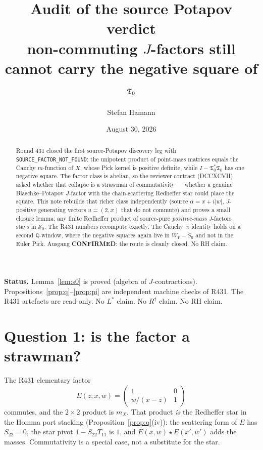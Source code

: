 \documentclass[11pt]{article}
\title{\bfseries Audit of the source Potapov verdict\\[2mm]
\large non-commuting $J$-factors still cannot carry the
negative square of $\Tfrak_0$}
\author{Stefan Hamann}
\date{August 30, 2026}
\theoremstyle{remark}
\newcommand{\Tfrak}{\mathfrak{T}}
\newcommand{\redh}{\mathbin{\star}}
\newcommand{\Sk}{\mathcal{S}}
\begin{document}
\maketitle

\begin{abstract}\noindent
Round 431 closed the first source-Potapov discovery
leg with \texttt{SOURCE\_FACTOR\_NOT\_FOUND}: the
unipotent product of point-mass matrices equals the
Cauchy $m$-function of $X$, whose Pick kernel is
positive definite, while $I-\Tfrak_0^*\Tfrak_0$ has one
negative square.
The factor class is abelian, so the reviewer contract
(DCCXCVII) asked whether that collapse is a strawman of
commutativity --- whether a genuine Blaschke--Potapov
$J$-factor with the chain-scattering Redheffer star could
place the square.
This note rebuilds that richer class independently
(source $\alpha=x+i\lvert w\rvert$, $J$-positive generating
vectors $u=(2,x)$ that do not commute) and proves a small
closure lemma: any finite Redheffer product of
source-pure \emph{positive-mass} $J$-factors stays in
$\Sk_0$.
The R431 numbers recompute exactly.
The Cauchy--$\pi$ identity holds on a second $\mathbb{Q}$-window,
where the negative squares again live in $W_Y-S_0$ and not
in the Euler Pick.
Ausgang \textbf{CONFIRMED}: the route is cleanly closed.
No RH claim.
\end{abstract}

\medskip\noindent
\textbf{Status.}\enspace
Lemma~\ref{lem:s0} is proved (algebra of $J$-contractions).
Propositions~\ref{prop:q}--\ref{prop:pi} are independent
machine checks of R431.
The R431 artefacts are read-only.
No $L^{*}$ claim.  No $R^\dagger$ claim.  No RH claim.

\section{Question 1: is the factor a strawman?}

The R431 elementary factor
\begin{equation}
E(z;x,w)
=\begin{pmatrix}1&0\\ w/(x-z)&1\end{pmatrix}
\end{equation}
commutes, and the $2\times 2$ product is $m_X$.
That product \emph{is} the Redheffer star in the Homma
port stacking (Proposition~\ref{prop:q}(iv)): the
scattering form of $E$ has $S_{22}=0$, the star pivot
$1-S_{22}T_{11}$ is $1$, and $E(x,w)\redh E(x',w')$
adds the masses.
Commutativity is a special case, not a substitute for the
star.
\end{document}
